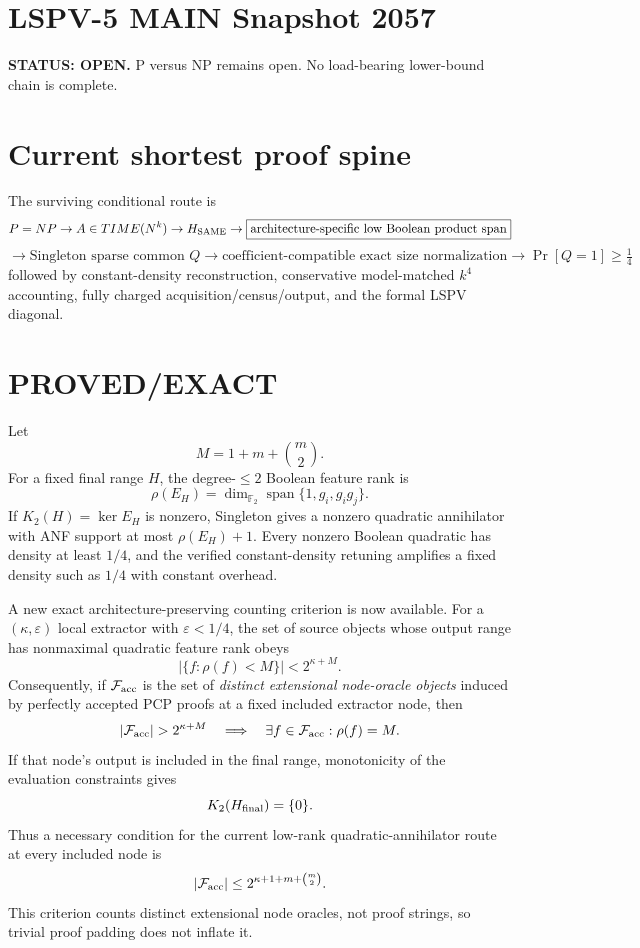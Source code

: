 \documentclass[11pt]{article}
\begin{document}
\section*{LSPV-5 MAIN Snapshot 2057}
\textbf{STATUS: OPEN.} P versus NP remains open. No load-bearing lower-bound chain is complete.

\section*{Current shortest proof spine}
The surviving conditional route is
\[
P=NP \to A\in TIME(N^k) \to H_{\rm SAME}
\to \boxed{\text{architecture-specific low Boolean product span}}
\]
\[
\to \text{Singleton sparse common }Q
\to \boxed{\text{coefficient-compatible exact size normalization}}
\to \Pr[Q=1]\ge \tfrac14
\]
followed by constant-density reconstruction, conservative model-matched $k^4$ accounting, fully charged acquisition/census/output, and the formal LSPV diagonal.

\section*{PROVED/EXACT}
Let
\[
M=1+m+\binom m2.
\]
For a fixed final range $H$, the degree-$\le2$ Boolean feature rank is
\[
\rho(E_H)=\dim_{\mathbb F_2}\operatorname{span}\{1,g_i,g_i g_j\}.
\]
If $K_2(H)=\ker E_H$ is nonzero, Singleton gives a nonzero quadratic annihilator with ANF support at most $\rho(E_H)+1$. Every nonzero Boolean quadratic has density at least $1/4$, and the verified constant-density retuning amplifies a fixed density such as $1/4$ with constant overhead.

A new exact architecture-preserving counting criterion is now available. For a $(\kappa,\varepsilon)$ local extractor with $\varepsilon<1/4$, the set of source objects whose output range has nonmaximal quadratic feature rank obeys
\[
\left|\{f:\rho(f)<M\}\right|<2^{\kappa+M}.
\]
Consequently, if $\mathcal F_{\rm acc}$ is the set of \emph{distinct extensional node-oracle objects} induced by perfectly accepted PCP proofs at a fixed included extractor node, then
\[
|\mathcal F_{\rm acc}|>2^{\kappa+M}
\quad\Longrightarrow\quad
\exists f\in\mathcal F_{\rm acc}:\rho(f)=M.
\]
If that node's output is included in the final range, monotonicity of the evaluation constraints gives
\[
K_2(H_{\rm final})=\{0\}.
\]
Thus a necessary condition for the current low-rank quadratic-annihilator route at every included node is
\[
|\mathcal F_{\rm acc}|\le 2^{\kappa+1+m+\binom m2}.
\]
This criterion counts distinct extensional node oracles, not proof strings, so trivial proof padding does not inflate it.
\end{document}
